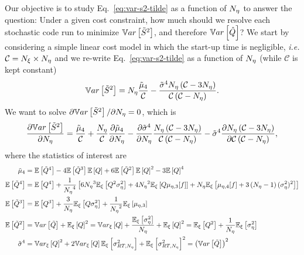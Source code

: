 Our objective is to study Eq.~\eqref{eq:var-s2-tilde} as a function of ${N_\eta}$ to answer the question: Under a given cost constraint, how much should we resolve each stochastic code run to minimize $\mathbb{V}ar\left[\tilde{S}^2\right]$, and therefore $\mathbb{V}ar\left[\hat{Q}\right]$? We start by considering a simple linear cost model in which the start-up time is negligible, \textit{i.e.} $\mathcal{C}={N_\xi} \times {N_\eta}$ and we re-write Eq.~\eqref{eq:var-s2-tilde} as a function of ${N_\eta}$ (while $\mathcal{C}$ is kept constant)
\begin{equation}
 \mathbb{V}ar\left[\tilde{S}^2\right] = {N_\eta} \frac{ \tilde{\mu}_4 }{ \mathcal{C} } - \frac{ \tilde{\sigma}^4 {N_\eta} \left( \mathcal{C} - 3 {N_\eta} \right) }{ \mathcal{C} \left( \mathcal{C} - {N_\eta} \right) }.
\end{equation}
We want to solve $\partial \mathbb{V}ar\left[\tilde{S}^2\right] / \partial {N_\eta} = 0$, which is
\begin{equation}\label{eq:dVar-dNeta}
 \frac{ \partial  \mathbb{V}ar\left[\tilde{S}^2\right]  }{ \partial  {N_\eta}  } = \frac{ \tilde{\mu}_4 }{ \mathcal{C} } + \frac{ {N_\eta} }{ \mathcal{C} } \frac{ \partial  \tilde{\mu}_4  }{ \partial  {N_\eta}  }
                                      - \frac{ \partial  \tilde{\sigma}^4  }{ \partial  {N_\eta}  } \frac{ {N_\eta} \left( \mathcal{C} - 3 {N_\eta} \right) }{ \mathcal{C} \left( \mathcal{C} - {N_\eta} \right) }
                                      - \tilde{\sigma}^4 \frac{ \partial  {N_\eta} \left( \mathcal{C} - 3 {N_\eta} \right)  }{ \partial  \mathcal{C} \left( \mathcal{C} - {N_\eta} \right)  },
\end{equation}
where the statistics of interest are  
\begin{equation} \label{eq:E_Q_tilde}
 \begin{split}
  \tilde{\mu}_{4} &= \mathbb{E}\left[ \tilde{Q}^4 \right] - 4 \mathbb{E}\left[ \tilde{Q}^3 \right] \mathbb{E}\left[ Q \right] + 6 \mathbb{E}\left[ \tilde{Q}^2 \right] \mathbb{E}\left[Q\right]^2 - 3 \mathbb{E}\left[ Q \right]^4   \\
  \mathbb{E}\left[\tilde{Q}^4\right] &= \mathbb{E}\left[ Q^4 \right] + \frac{1}{{N_\eta}^4} \left[ 6 {N_\eta}^3 \mathbb{E}_\xi\left[ Q^2 \sigma^2_\eta \right] + 4 {N_\eta}^2 \mathbb{E}_\xi\left[ Q \mu_{\eta,3}[f] \right] 
               + {N_\eta} \mathbb{E}_\xi\left[ \mu_{\eta,4}[f] + 3 \left( {N_\eta}-1 \right) (\sigma^2_\eta)^2\right] \right] \\
  \mathbb{E}\left[\tilde{Q}^3\right] &= \mathbb{E}\left[Q^3\right] + \frac{3}{{N_\eta}} \mathbb{E}_\xi\left[ Q \sigma^2_\eta \right] + \frac{1}{{N_\eta}^2} \mathbb{E}_\xi\left[ \mu_{\eta,3} \right] \\
  \mathbb{E}\left[\tilde{Q}^2\right] &= \mathbb{V}ar\left[\tilde{Q}\right] + \mathbb{E}_\xi\left[Q\right]^2 = \mathbb{V}ar_\xi\left[Q\right] + \frac{ \mathbb{E}_\xi\left[ \sigma^2_\eta \right] }{ {N_\eta} } + \mathbb{E}_\xi\left[Q\right]^2 = \mathbb{E}_\xi\left[Q^2\right] + \frac{1}{{N_\eta}}\mathbb{E}_\xi\left[\sigma^2_\eta\right]\\
   \tilde{\sigma}^4 &= \mathbb{V}ar_\xi\left[Q\right]^2 + 2 \mathbb{V}ar_\xi\left[Q\right] \mathbb{E}_\xi\left[ \sigma^2_{RT,{N_\eta}} \right] + \mathbb{E}_\xi\left[ \sigma^2_{RT,{N_\eta}} \right]^2 = \left( \mathbb{V}ar\left[ \tilde{Q} \right] \right)^2\\  
 \end{split}
\end{equation}
